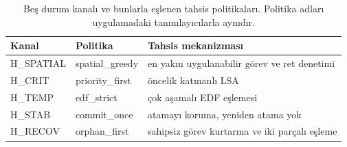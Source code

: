 \begin{table}[t]
\centering
\caption{Beş durum kanalı ve bunlarla eşlenen tahsis politikaları. Politika
adları uygulamadaki tanımlayıcılarla aynıdır.}
\label{tab:hormones}
\small
\setlength{\tabcolsep}{4pt}
\begin{tabular}{llp{7.5cm}}
\toprule
\textbf{Kanal} & \textbf{Politika} & \textbf{Tahsis mekanizması} \\
\midrule
H\_SPATIAL & spatial\_greedy   & en yakın uygulanabilir görev ve ret denetimi \\
H\_CRIT    & priority\_first   & öncelik katmanlı LSA \\
H\_TEMP    & edf\_strict       & çok aşamalı EDF eşlemesi \\
H\_STAB    & commit\_once      & atamayı koruma, yeniden atama yok \\
H\_RECOV   & orphan\_first     & sahipsiz görev kurtarma ve iki parçalı eşleme \\
\bottomrule
\end{tabular}
\end{table}
